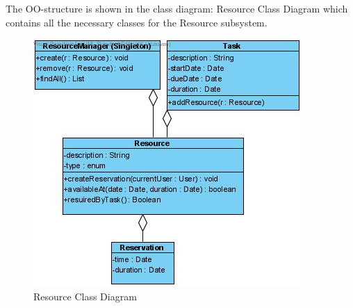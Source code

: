 			The OO-structure is shown in the class diagram: Resource Class Diagram which contains all the necessary classes for the Resource subsystem.
			
			\begin{figure}[h!]
				\begin{center}
					\includegraphics[scale=0.5]{images/resource_class_diagram.jpg}
				\end{center}
				\caption{Resource Class Diagram}
			\end{figure}
